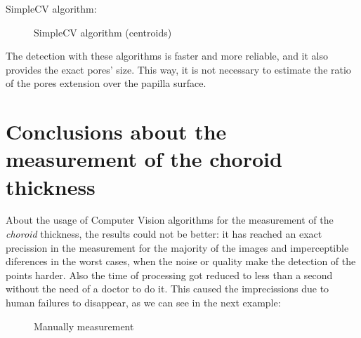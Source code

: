 SimpleCV algorithm:

    \begin{figure}[H]
      \caption{SimpleCV algorithm (centroids)}
      \centering \setlength\fboxsep{0pt} \setlength\fboxrule{0.5pt}
    \end{figure}

The detection with these algorithms is faster and more reliable, and it
also provides the exact pores' size. This way, it is not necessary to
estimate the ratio of the pores extension over the papilla surface.


\section{Conclusions about the measurement of the choroid thickness}
About the usage of Computer Vision algorithms for the measurement of
the \emph{choroid} thickness, the results could not be better:
it has reached an exact precission in the measurement for the majority
of the images and imperceptible diferences in the worst cases, when
the noise or quality make the detection of the points harder.
Also the time of processing got reduced to less than a second without
the need of a doctor to do it. This caused the imprecissions due to human 
failures to disappear, as we can see in the next example:

    \begin{figure}[H]
      \caption{Manually measurement}
      \centering \setlength\fboxsep{0pt} \setlength\fboxrule{0.5pt}
    \end{figure}

